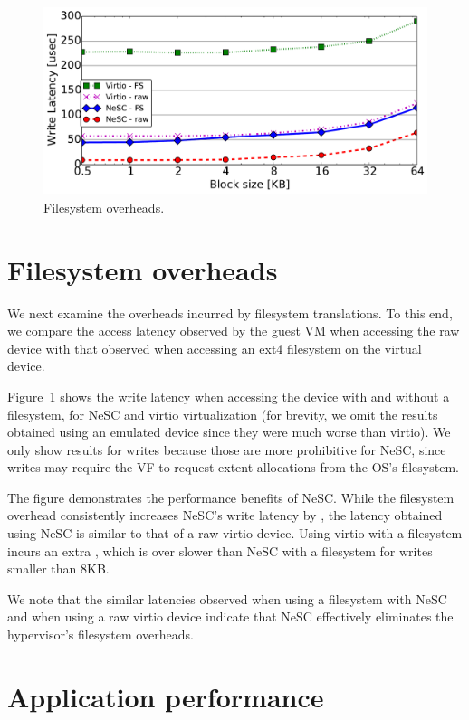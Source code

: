 \begin{figure}[t]
  \centering
  \includegraphics[width=1\columnwidth]{figs/fs_affect.pdf}
  \caption{Filesystem overheads.}
  \label{fig:fs_effect}
\end{figure}

\section*{Filesystem overheads}
We next examine the overheads incurred by filesystem translations. To this end, we compare the access latency observed by the guest VM when accessing the raw device with that observed when accessing an ext4 filesystem on the virtual device.

Figure~\ref{fig:fs_effect} shows the write latency when accessing the device with and without a filesystem, for NeSC and virtio virtualization (for brevity, we omit the results obtained using an emulated device since they were much worse than virtio). We only show results for writes because those are more prohibitive for NeSC, since writes may require the VF to request extent allocations from the OS's filesystem.

The figure demonstrates the performance benefits of NeSC. While the filesystem overhead consistently increases NeSC's write latency by \us, the latency obtained using NeSC is similar to that of a raw virtio device. Using virtio with a filesystem incurs an extra \us, which is over  slower than NeSC with a filesystem for writes smaller than 8KB.

We note that the similar latencies observed when using a filesystem with NeSC and when using a raw virtio device indicate that NeSC effectively eliminates the hypervisor's filesystem overheads.

\section*{Application performance}

